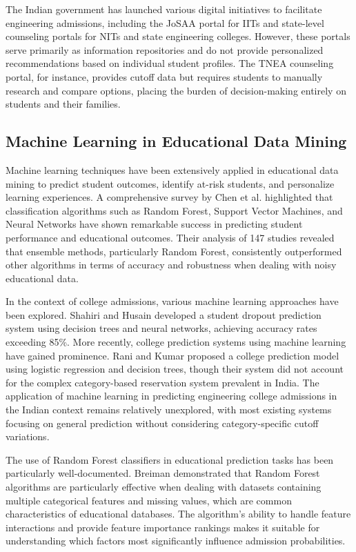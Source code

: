 \documentclass[journal]{IEEEtran}
\begin{document}
The Indian government has launched various digital initiatives to facilitate engineering admissions, including the JoSAA portal for IITs and state-level counseling portals for NITs and state engineering colleges. However, these portals serve primarily as information repositories and do not provide personalized recommendations based on individual student profiles. The TNEA counseling portal, for instance, provides cutoff data but requires students to manually research and compare options, placing the burden of decision-making entirely on students and their families.

\subsection{Machine Learning in Educational Data Mining}
Machine learning techniques have been extensively applied in educational data mining to predict student outcomes, identify at-risk students, and personalize learning experiences. A comprehensive survey by Chen et al. \cite{chen2020} highlighted that classification algorithms such as Random Forest, Support Vector Machines, and Neural Networks have shown remarkable success in predicting student performance and educational outcomes. Their analysis of 147 studies revealed that ensemble methods, particularly Random Forest, consistently outperformed other algorithms in terms of accuracy and robustness when dealing with noisy educational data.

In the context of college admissions, various machine learning approaches have been explored. Shahiri and Husain \cite{shahiri2015} developed a student dropout prediction system using decision trees and neural networks, achieving accuracy rates exceeding 85\%. More recently, college prediction systems using machine learning have gained prominence. Rani and Kumar \cite{rani2019} proposed a college prediction model using logistic regression and decision trees, though their system did not account for the complex category-based reservation system prevalent in India. The application of machine learning in predicting engineering college admissions in the Indian context remains relatively unexplored, with most existing systems focusing on general prediction without considering category-specific cutoff variations.

The use of Random Forest classifiers in educational prediction tasks has been particularly well-documented. Breiman \cite{breiman2001} demonstrated that Random Forest algorithms are particularly effective when dealing with datasets containing multiple categorical features and missing values, which are common characteristics of educational databases. The algorithm's ability to handle feature interactions and provide feature importance rankings makes it suitable for understanding which factors most significantly influence admission probabilities.
\end{document}
